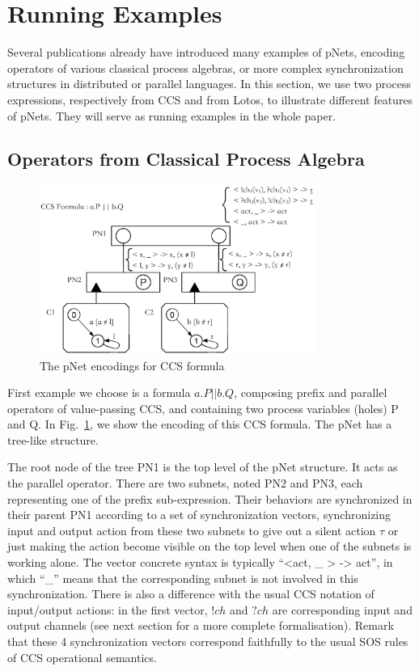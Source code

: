 \documentclass{lncs/llncs}
\begin{document}
\section{Running Examples}
\label{section:examples}

Several publications \cite{HMZ:PDP15,henrio:Forte2016} already have introduced
many examples of pNets, encoding
operators of various classical process algebras, or more complex
synchronization structures in distributed or parallel languages.
In this section, we use two process expressions, respectively from CCS
and from Lotos, to illustrate different features of pNets. They will
serve as running examples in the whole paper.  


\subsection{Operators from Classical Process Algebra}

\begin{figure}[h]
  \centerline{\includegraphics[width=9cm]{XFIG/CCS1}}
  \caption{The pNet encodings for CCS formula}  \label{schema:ccs-pnets}
\end{figure}

First example we choose is a formula $a.P||b.Q$, composing prefix and
parallel operators of value-passing CCS, and containing two process
variables (holes) P and Q. In Fig.~\ref{schema:ccs-pnets}, we show the encoding of this CCS
formula. The pNet has a tree-like structure.  

The root node of the tree PN1 is the top level of the pNet
  structure. It acts as the parallel operator. There are two subnets,
  noted PN2 and PN3, each representing one of the prefix
  sub-expression. Their behaviors are synchronized in their parent PN1
  according to a set of synchronization vectors, synchronizing input
  and output action from these two subnets to give out a silent action
  $\tau$ or just making the action become visible on the top level when
  one of the subnets is working alone. The vector concrete syntax is typically
  ``<act, \_ > -> act'', in which ``\_'' means that the corresponding
  subnet is not involved in this synchronization.
  There is also a difference with the usual CCS notation of
  input/output actions: in the first vector, $!ch$ and $?ch$ are
  corresponding input and output channels (see next section for a more
  complete formalisation). 
  Remark that these 4
  synchronization vectors correspond faithfully to the usual SOS
  rules of CCS operational semantics.
\end{document}
